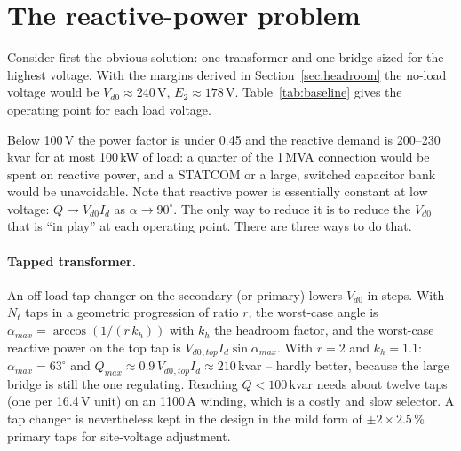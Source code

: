 \documentclass[11pt,a4paper]{article}
\newcommand{\Vdo}{V_{d0}}
\newcommand{\Id}{I_d}
\newcommand{\ex}{e_x}
\newcommand{\Ell}{E_{2}}
\begin{document}
\section{The reactive-power problem}
\label{sec:q}

Consider first the obvious solution: one transformer and one bridge sized for the highest voltage. With the margins derived in Section~\ref{sec:headroom} the no-load voltage would be $\Vdo \approx 240$\,V, $\Ell \approx 178$\,V. Table~\ref{tab:baseline} gives the operating point for each load voltage.

\begin{table}[h]
\centering

\caption{Single bridge, $\Vdo = 240$\,V, $\ex = 6$\,\%, 1050\,A. The line current is 333\,A at every operating point, only its phase changes.}
\label{tab:baseline}
\end{table}

Below 100\,V the power factor is under 0.45 and the reactive demand is 200--230\,kvar for at most 100\,kW of load: a quarter of the 1\,MVA connection would be spent on reactive power, and a STATCOM or a large, switched capacitor bank would be unavoidable. Note that reactive power is essentially constant at low voltage: $Q \to \Vdo\Id$ as $\alpha \to 90^\circ$. The only way to reduce it is to reduce the $\Vdo$ that is ``in play'' at each operating point. There are three ways to do that.

\paragraph{Tapped transformer.} An off-load tap changer on the secondary (or primary) lowers $\Vdo$ in steps. With $N_t$ taps in a geometric progression of ratio $r$, the worst-case angle is $\alpha_{max} = \arccos(1/(r\,k_h))$ with $k_h$ the headroom factor, and the worst-case reactive power on the top tap is $\Vdo{}_{,top}\Id\sin\alpha_{max}$. With $r = 2$ and $k_h = 1.1$: $\alpha_{max} = 63^\circ$ and $Q_{max} \approx 0.9\,\Vdo{}_{,top}\Id \approx 210$\,kvar -- hardly better, because the large bridge is still the one regulating. Reaching $Q < 100$\,kvar needs about twelve taps (one per 16.4\,V unit) on an 1100\,A winding, which is a costly and slow selector. A tap changer is nevertheless kept in the design in the mild form of $\pm2\times2.5$\,\% primary taps for site-voltage adjustment.
\end{document}
